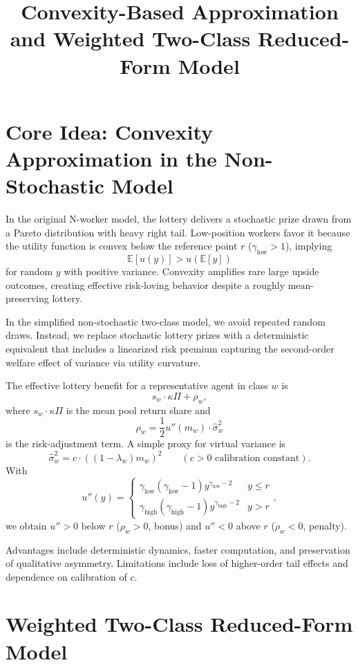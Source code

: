 \documentclass[11pt]{article}
\title{Convexity-Based Approximation and Weighted Two-Class Reduced-Form Model}
\author{}
\date{}
\begin{document}
\maketitle

\section{Core Idea: Convexity Approximation in the Non-Stochastic Model}

In the original N-worker model, the lottery delivers a stochastic prize drawn from a Pareto distribution with heavy right tail. Low-position workers favor it because the utility function is convex below the reference point $r$ ($\gamma_\text{low} > 1$), implying
\[
\mathbb{E}[u(y)] > u(\mathbb{E}[y])
\]
for random $y$ with positive variance. Convexity amplifies rare large upside outcomes, creating effective risk-loving behavior despite a roughly mean-preserving lottery.

In the simplified non-stochastic two-class model, we avoid repeated random draws. Instead, we replace stochastic lottery prizes with a deterministic equivalent that includes a linearized risk premium capturing the second-order welfare effect of variance via utility curvature.

The effective lottery benefit for a representative agent in class $w$ is
\[
s_w \cdot \kappa \Pi + \rho_w,
\]
where $s_w \cdot \kappa \Pi$ is the mean pool return share and
\[
\rho_w = \frac{1}{2} u''(m_w) \cdot \widehat{\sigma}_w^2
\]
is the risk-adjustment term. A simple proxy for virtual variance is
\[
\widehat{\sigma}_w^2 = c \cdot ((1 - \lambda_w) m_w)^2 \qquad (c > 0 \text{ calibration constant}).
\]
With
\[
u''(y) = 
\begin{cases} 
\gamma_\text{low}(\gamma_\text{low}-1) y^{\gamma_\text{low}-2} & y \leq r \\
\gamma_\text{high}(\gamma_\text{high}-1) y^{\gamma_\text{high}-2} & y > r
\end{cases},
\]
we obtain $u'' > 0$ below $r$ ($\rho_w > 0$, bonus) and $u'' < 0$ above $r$ ($\rho_w < 0$, penalty).

Advantages include deterministic dynamics, faster computation, and preservation of qualitative asymmetry. Limitations include loss of higher-order tail effects and dependence on calibration of $c$.

\section{Weighted Two-Class Reduced-Form Model}
\end{document}

